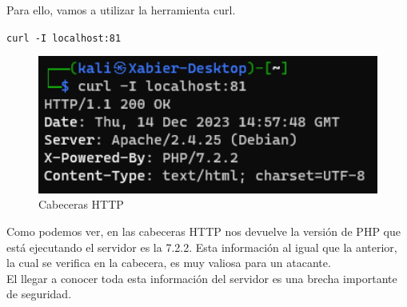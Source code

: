 \documentclass{report}
\begin{document}
                Para ello, vamos a utilizar la herramienta curl.
                \begin{center}
                    \texttt{curl -I localhost:81}
                \end{center}
                \begin{figure}[H]
                    \centering
                    \includegraphics[width=1\textwidth]{./img/vulnerabilidades/2.4/1.2.png}
                    \caption{Cabeceras HTTP}
                \end{figure}
                Como podemos ver, en las cabeceras HTTP nos devuelve la versión de PHP que está ejecutando el servidor es la 7.2.2.
                Esta información al igual que la anterior, la cual se verifica en la cabecera, es muy valiosa para un atacante.\\

                El llegar a conocer toda esta información del servidor es una brecha importante de seguridad.

            \clearpage
\end{document}
